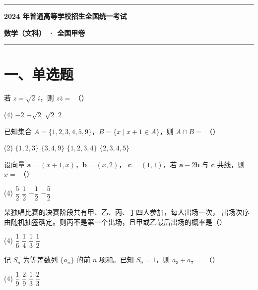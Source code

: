 \documentclass[UTF8,12pt]{ctexart}
\newcommand{\examtitle}{2024 年普通高等学校招生全国统一考试}
\newcommand{\examsubtitle}{数学（文科） · 全国甲卷}
\newcommand{\choiceparen}{（\hspace{2em}）}                    %
\newcommand{\makeexamtitle}{%
  \begin{center}
    {\color{accent}\rule{\linewidth}{1.6pt}}\par\vspace{0.8em}
    {\LARGE\bfseries\examtitle}\par\vspace{0.4em}
    {\Large\bfseries\color{accent}\examsubtitle}\par\vspace{0.6em}
    {\color{accent}\rule{\linewidth}{0.5pt}}
  \end{center}}
\begin{document}
\makeexamtitle

\section*{一、单选题}

\begin{questions}

  \item 若 $z = \sqrt{2}\,i$，则 $z\overline{z} =$ \choiceparen{}
    \begin{tasks}(4)
      \task $-2$
      \task $-\sqrt{2}$
      \task $\sqrt{2}$
      \task $2$
    \end{tasks}

  \item 已知集合 $A = \{1, 2, 3, 4, 5, 9\}$，$B = \{x \mid x + 1 \in A\}$，则
    $A \cap B =$ \choiceparen{}
    \begin{tasks}(2)
      \task $\{1,2,3\}$
      \task $\{3,4,9\}$
      \task $\{1,2,3,4\}$
      \task $\{2,3,4,5\}$
    \end{tasks}

  \item 设向量 $\boldsymbol{a} = (x + 1, x)$，$\boldsymbol{b} = (x, 2)$，%
    $\boldsymbol{c} = (1, 1)$，若 $\boldsymbol{a} - 2\boldsymbol{b}$ 与 $\boldsymbol{c}$
    共线，则 $x =$ \choiceparen{}
    \begin{tasks}(4)
      \task $\dfrac{5}{2}$
      \task $\dfrac{1}{2}$
      \task $-\dfrac{1}{2}$
      \task $-\dfrac{5}{2}$
    \end{tasks}

  \item 某独唱比赛的决赛阶段共有甲、乙、丙、丁四人参加，每人出场一次，
    出场次序由随机抽签确定。则丙不是第一个出场，且甲或乙最后出场的概率是\choiceparen{}
    \begin{tasks}(4)
      \task $\dfrac{1}{6}$
      \task $\dfrac{1}{4}$
      \task $\dfrac{1}{3}$
      \task $\dfrac{1}{2}$
    \end{tasks}

  \item 记 $S_{n}$ 为等差数列 $\{a_{n}\}$ 的前 $n$ 项和。已知 $S_{9}=1$，则
    $a_{3}+a_{7}=$ \choiceparen{}
    \begin{tasks}(4)
      \task $\dfrac{1}{9}$
      \task $\dfrac{2}{9}$
      \task $\dfrac{1}{3}$
      \task $\dfrac{2}{3}$
    \end{tasks}


\end{questions}
\end{document}
